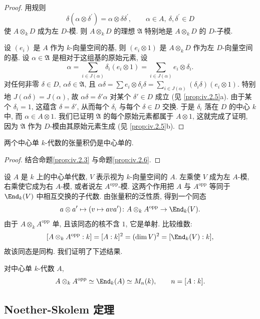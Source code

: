\begin{proof}
用规则
\[
\delta(\alpha\otimes\delta^{\prime})=\alpha\otimes\delta\delta^{\prime},\qquad \alpha\in A,\ \delta,\delta^{\prime}\in D
\]
使 $A\otimes_k D$ 成为左 $D$-模. 则 $A\otimes_k D$ 的理想 $\mathfrak{A}$ 特别地是 $A\otimes_k D$ 的 $D$-子模.

设 $(e_i)$ 是 $A$ 作为 $k$-向量空间的基, 则 $(e_i\otimes 1)$ 是 $A\otimes_k D$ 作为左 $D$-向量空间的基. 设 $\alpha\in\mathfrak{A}$ 是相对于这组基的原始元素, 设
\[
\alpha=\sum_{i\in J(\alpha)}\delta_{i}(e_{i}\otimes1)=\sum_{i\in J(\alpha)}e_{i}\otimes\delta_{i}.
\]
对任何非零 $\delta\in D$, $\alpha\delta\in\mathfrak{A}$, 且 $\alpha\delta=\sum e_i\otimes\delta_i\delta=\sum_{i\in J(\alpha)}(\delta_i\delta)(e_i\otimes 1)$. 特别地 $J(\alpha\delta)=J(\alpha)$, 故 $\alpha\delta=\delta'\alpha$ 对某个 $\delta'\in D$ 成立 (见 \ref{prop:iv.2.5}a). 由于某个 $\delta_i=1$, 这蕴含 $\delta=\delta'$, 从而每个 $\delta_i$ 与每个 $\delta\in D$ 交换. 于是 $\delta_i$ 落在 $D$ 的中心 $k$ 中, 而 $\alpha\in A\otimes 1$. 我们已证明 $\mathfrak{A}$ 的每个原始元素都属于 $A\otimes 1$, 这就完成了证明, 因为 $\mathfrak{A}$ 作为 $D$-模由其原始元素生成 (见 \ref{prop:iv.2.5}b).
\end{proof}

\begin{corollary}\label{cor:iv.2.8}
两个中心单 $k$-代数的张量积仍是中心单的.
\end{corollary}

\begin{proof}
结合命题\ref{prop:iv.2.3} 与命题\ref{prop:iv.2.6}.
\end{proof}

设 $A$ 是 $k$ 上的中心单代数, $V$ 表示视为 $k$-向量空间的 $A$. 左乘使 $V$ 成为左 $A$-模, 右乘使它成为右 $A$-模, 或者说左 $A^{\mathrm{opp}}$-模. 这两个作用把 $A$ 与 $A^{\mathrm{opp}}$ 等同于 $\End_k(V)$ 中相互交换的子代数. 由张量积的泛性质, 得到一个同态
\[
a\otimes a^{\prime}\mapsto(v\mapsto ava^{\prime})\colon A\otimes_{k}A^{\mathrm{opp}}\to\End_{k}(V).
\]
由于 $A\otimes_k A^{\mathrm{opp}}$ 单, 且该同态的核不含 $1$, 它是单射. 比较维数:
\[
[A\otimes_{k}A^{\mathrm{opp}}:k]=[A:k]^{2}=(\dim V)^{2}=[\End_{k}(V):k],
\]
故该同态是同构. 我们证明了下述结果.

\begin{corollary}\label{cor:iv.2.9}
对中心单 $k$-代数 $A$,
\[
A\otimes_{k}A^{\mathrm{opp}}\simeq\End_{k}(A)\simeq M_{n}(k),\qquad n=[A:k].
\]
\end{corollary}

\subsection*{Noether-Skolem 定理}

